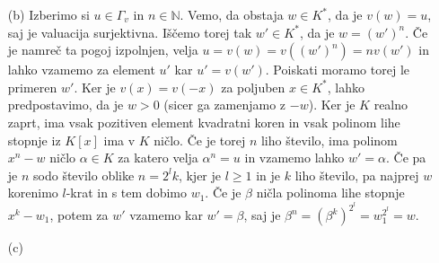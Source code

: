 \documentclass[a4paper, 12pt]{article}
\newcommand{\N}{\mathbb{N}}
\begin{document}
\begin{enumerate}
\item[(b)] Izberimo si $u\in \Gamma_v$ in $n\in \N$. Vemo, da obstaja $w\in K^*$, da je $v(w) = u$, saj je valuacija surjektivna. Iščemo torej tak $w'\in K^*$, da je $w = (w')^n$. Če je namreč ta pogoj izpolnjen, velja $u = v(w)=  v((w')^n) = nv(w')$ in lahko vzamemo za element $u'$ kar $u'=v(w')$. Poiskati moramo torej le primeren $w'$. Ker je $v(x) = v(-x)$ za poljuben $x\in K^*$, lahko predpostavimo, da je $w > 0$ (sicer ga zamenjamo z $-w$). Ker je $K$ realno zaprt, ima vsak pozitiven element kvadratni koren in vsak polinom lihe stopnje iz $K[x]$ ima v $K$ ničlo. Če je torej $n$ liho število, ima polinom $x^n - w$ ničlo $\alpha \in K$ za katero velja $\alpha^n = u$ in vzamemo lahko $w' = \alpha$. Če pa je $n$ sodo število oblike $n = 2^l k$, kjer je $l\ge 1$ in je $k$ liho število, pa najprej $w$ korenimo $l$-krat in s tem dobimo $w_1$. Če je $ \beta $ ničla polinoma lihe stopnje $x^k - w_1$, potem za $w'$ vzamemo kar $w' = \beta$, saj je $\beta^n = (\beta^k ) ^{2^l}   = w_1^{2^l} = w$. 

\item[(c)]

\end{enumerate}
\end{document}
